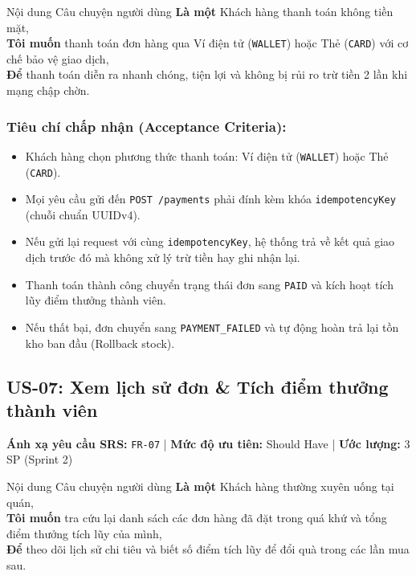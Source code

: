 \documentclass[12pt,a4paper]{article}
\begin{document}
\begin{storybox}{Nội dung Câu chuyện người dùng}
\textbf{Là một} Khách hàng thanh toán không tiền mặt,\\
\textbf{Tôi muốn} thanh toán đơn hàng qua Ví điện tử (\texttt{WALLET}) hoặc Thẻ (\texttt{CARD}) với cơ chế bảo vệ giao dịch,\\
\textbf{Để} thanh toán diễn ra nhanh chóng, tiện lợi và không bị rủi ro trừ tiền 2 lần khi mạng chập chờn.
\end{storybox}

\subsubsection*{Tiêu chí chấp nhận (Acceptance Criteria):}
\begin{itemize}[noitemsep]
    \item[\textbf{AC-06.1}] Khách hàng chọn phương thức thanh toán: Ví điện tử (\texttt{WALLET}) hoặc Thẻ (\texttt{CARD}).
    \item[\textbf{AC-06.2}] Mọi yêu cầu gửi đến \texttt{POST /payments} phải đính kèm khóa \texttt{idempotencyKey} (chuỗi chuẩn UUIDv4).
    \item[\textbf{AC-06.3}] Nếu gửi lại request với cùng \texttt{idempotencyKey}, hệ thống trả về kết quả giao dịch trước đó mà không xử lý trừ tiền hay ghi nhận lại.
    \item[\textbf{AC-06.4}] Thanh toán thành công chuyển trạng thái đơn sang \texttt{PAID} và kích hoạt tích lũy điểm thưởng thành viên.
    \item[\textbf{AC-06.5}] Nếu thất bại, đơn chuyển sang \texttt{PAYMENT\_FAILED} và tự động hoàn trả lại tồn kho ban đầu (Rollback stock).
\end{itemize}

\newpage

\subsection{US-07: Xem lịch sử đơn \& Tích điểm thưởng thành viên}
\textbf{Ánh xạ yêu cầu SRS:} \texttt{FR-07} \quad | \quad \textbf{Mức độ ưu tiên:} Should Have \quad | \quad \textbf{Ước lượng:} 3 SP (Sprint 2)

\begin{storybox}{Nội dung Câu chuyện người dùng}
\textbf{Là một} Khách hàng thường xuyên uống tại quán,\\
\textbf{Tôi muốn} tra cứu lại danh sách các đơn hàng đã đặt trong quá khứ và tổng điểm thưởng tích lũy của mình,\\
\textbf{Để} theo dõi lịch sử chi tiêu và biết số điểm tích lũy để đổi quà trong các lần mua sau.
\end{storybox}
\end{document}
